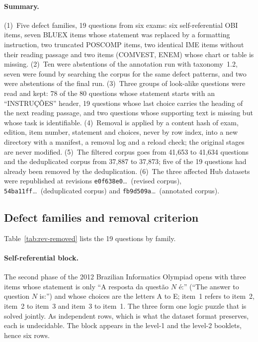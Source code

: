 \paragraph{Summary.} (1)~Five defect families, 19 questions from six exams:
six self-referential OBI items, seven BLUEX items whose statement was
replaced by a formatting instruction, two truncated POSCOMP items, two
identical IME items without their reading passage and two items (COMVEST,
ENEM) whose chart or table is missing. (2)~Ten were abstentions of the
annotation run with taxonomy~1.2, seven were found by searching the corpus
for the same defect patterns, and two were abstentions of the final run.
(3)~Three groups of look-alike questions were read and kept: 78 of the 80
questions whose statement starts with an ``INSTRUÇÕES'' header, 19 questions
whose last choice carries the heading of the next reading passage, and two
questions whose supporting text is missing but whose task is identifiable.
(4)~Removal is applied by a content hash of exam, edition, item number,
statement and choices, never by row index, into a new directory with a
manifest, a removal log and a reload check; the original stages are never
modified. (5)~The filtered corpus goes from 41,653 to 41,634 questions and
the deduplicated corpus from 37,887 to 37,873; five of the 19 questions had
already been removed by the deduplication. (6)~The three affected Hub
datasets were republished at revisions \texttt{e0f638e0}\ldots\ (revised
corpus), \texttt{54ba11ff}\ldots\ (deduplicated corpus) and
\texttt{fb9d509a}\ldots\ (annotated corpus).

\subsection{Defect families and removal criterion}
\label{app:rev-criteria}

Table~\ref{tab:rev-removed} lists the 19 questions by family.

\paragraph{Self-referential block.} The second phase of the 2012 Brazilian
Informatics Olympiad opens with three items whose statement is only ``A
resposta da questão $N$ é:'' (``The answer to question $N$ is:'') and whose
choices are the letters A to E; item~1 refers to item~2, item~2 to item~3 and
item~3 to item~1. The three form one logic puzzle that is solved jointly. As
independent rows, which is what the dataset format preserves, each is
undecidable. The block appears in the level-1 and the level-2 booklets, hence
six rows.

